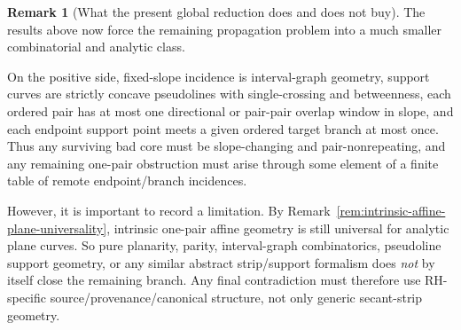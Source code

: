 \documentclass[11pt,a4paper]{amsart}
\theoremstyle{plain}
\theoremstyle{definition}
\newtheorem{remark}[theorem]{Remark}
\begin{document}
\begin{remark}[What the present global reduction does and does not buy]
\label{rem:what-global-reduction-does-and-does-not-buy}
The results above now force the remaining propagation problem into a much
smaller combinatorial and analytic class.

On the positive side, fixed-slope incidence is interval-graph geometry,
support curves are strictly concave pseudolines with single-crossing and
betweenness, each ordered pair has at most one directional or pair-pair overlap
window in slope, and each endpoint support point meets a given ordered target
branch at most once. Thus any surviving bad core must be slope-changing and
pair-nonrepeating, and any remaining one-pair obstruction must arise through
some element of a finite table of remote endpoint/branch incidences.

However, it is important to record a limitation. By
Remark~\ref{rem:intrinsic-affine-plane-universality}, intrinsic one-pair affine
geometry is still universal for analytic plane curves. So pure planarity,
parity, interval-graph combinatorics, pseudoline support geometry, or any
similar abstract strip/support formalism does \emph{not} by itself close the
remaining branch. Any final contradiction must therefore use RH-specific
source/provenance/canonical structure, not only generic secant-strip geometry.
\end{remark}
\end{document}
